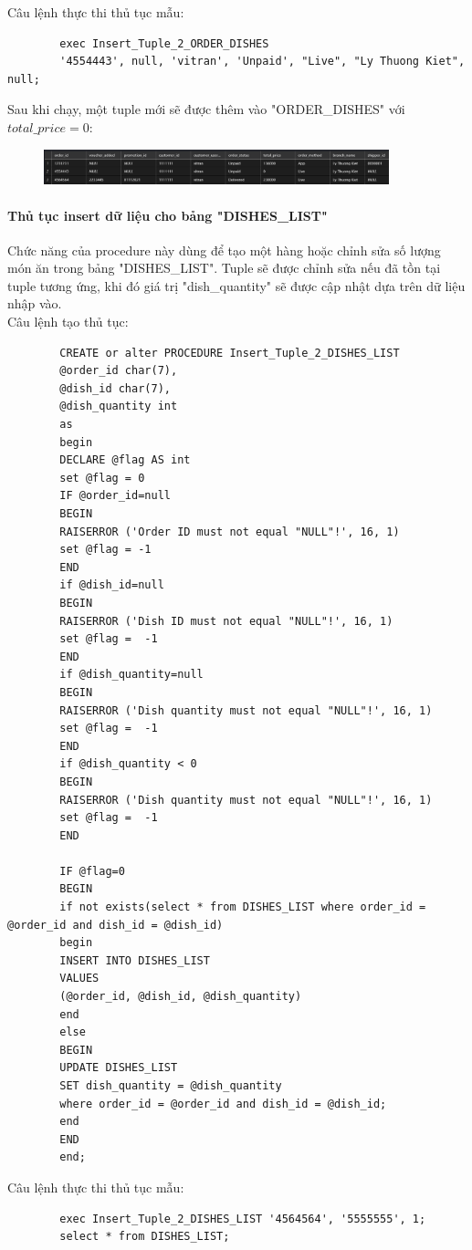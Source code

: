 \documentclass[13pt,a4paper]{article}
\begin{document}
	Câu lệnh thực thi thủ tục mẫu:
	\begin{lstlisting}
		exec Insert_Tuple_2_ORDER_DISHES 
		'4554443', null, 'vitran', 'Unpaid', "Live", "Ly Thuong Kiet", null;
	\end{lstlisting}
	Sau khi chạy, một tuple mới sẽ được thêm vào "ORDER\_DISHES" với $total\_price = 0$:
	\begin{figure}[h!]
		\begin{center}
			\includegraphics[width=10cm]{vitran/p_insert_od.png}
		\end{center}
	\end{figure}
	\paragraph{Thủ tục insert dữ liệu cho bảng "DISHES\_LIST"\\}
	Chức năng của procedure này dùng để tạo một hàng hoặc chỉnh sửa số lượng món ăn trong bảng "DISHES\_LIST". Tuple sẽ được chỉnh sửa nếu đã tồn tại tuple tương ứng, khi đó giá trị "dish\_quantity" sẽ được cập nhật dựa trên dữ liệu nhập vào.\\
	Câu lệnh tạo thủ tục:
	\begin{lstlisting}
		CREATE or alter PROCEDURE Insert_Tuple_2_DISHES_LIST
		@order_id char(7),
		@dish_id char(7),
		@dish_quantity int
		as
		begin
		DECLARE @flag AS int
		set @flag = 0
		IF @order_id=null 
		BEGIN
		RAISERROR ('Order ID must not equal "NULL"!', 16, 1)
		set @flag = -1
		END
		if @dish_id=null
		BEGIN
		RAISERROR ('Dish ID must not equal "NULL"!', 16, 1)
		set @flag =  -1
		END
		if @dish_quantity=null
		BEGIN
		RAISERROR ('Dish quantity must not equal "NULL"!', 16, 1)
		set @flag =  -1
		END
		if @dish_quantity < 0
		BEGIN
		RAISERROR ('Dish quantity must not equal "NULL"!', 16, 1)
		set @flag =  -1
		END
		
		IF @flag=0
		BEGIN
		if not exists(select * from DISHES_LIST where order_id = @order_id and dish_id = @dish_id)
		begin
		INSERT INTO DISHES_LIST
		VALUES
		(@order_id, @dish_id, @dish_quantity)
		end
		else
		BEGIN
		UPDATE DISHES_LIST 
		SET dish_quantity = @dish_quantity 
		where order_id = @order_id and dish_id = @dish_id;
		end
		END
		end;
	\end{lstlisting}
	Câu lệnh thực thi thủ tục mẫu:
	\begin{lstlisting}
		exec Insert_Tuple_2_DISHES_LIST '4564564', '5555555', 1;
		select * from DISHES_LIST;
	\end{lstlisting}
\end{document}
